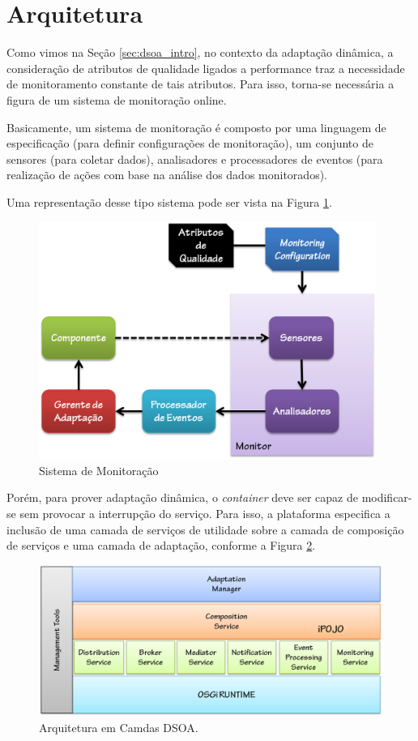 \section{Arquitetura}
\label{sec:dsoa_arch}

Como vimos na Seção \ref{sec:dsoa_intro}, no contexto da adaptação dinâmica, a consideração de atributos de qualidade ligados a performance traz a necessidade de monitoramento constante de tais atributos. Para isso, torna-se necessária a figura de um sistema de monitoração online.

Basicamente, um sistema de monitoração é composto por uma linguagem de especificação (para definir configurações de monitoração), um conjunto de sensores (para coletar dados), analisadores e processadores de eventos (para realização de ações com base na análise dos dados monitorados). 

Uma representação desse tipo sistema pode ser vista na Figura \ref{fig:monitor}.


\begin{figure}[htp]
\centering
\includegraphics[width=11cm]{chapters/chapter3/monitor.png}
\caption{Sistema de Monitoração}
\label{fig:monitor}
\end{figure}

Porém, para prover adaptação dinâmica, o \textit{container} deve ser capaz de modificar-se sem provocar a interrupção do serviço. Para isso, a plataforma especifica a inclusão de uma camada de serviços de utilidade sobre a camada de composição de serviços e uma camada de adaptação, conforme a Figura \ref{fig:dsoa_arch}.

\begin{figure}[htp]
\centering
\includegraphics[width=13cm]{chapters/chapter3/dsoa-arch.png}
\caption[Arquitetura em Camdas DSOA]{Arquitetura em Camdas DSOA.}
\label{fig:dsoa_arch}
\end{figure}

